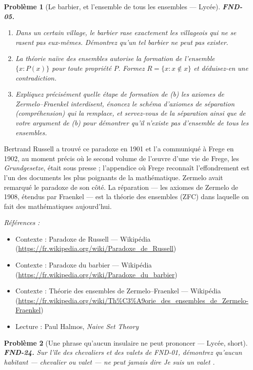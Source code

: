 \documentclass[11pt]{article}
\newtheorem{problem}{Problème}
\newenvironment{refs}{\par\small\noindent\emph{Références :}\begin{itemize}\setlength\itemsep{0pt}}{\end{itemize}\normalsize}
\begin{document}
\begin{problem}[{Le barbier, et l'ensemble de tous les ensembles --- Lycée}]
\textbf{FND-05.} \begin{enumerate}
\item[(a)] Dans un certain village, le barbier rase exactement les
villageois qui ne se rasent pas eux-mêmes. Démontrez qu'un tel barbier ne peut pas exister.
\item[(b)] La théorie naïve des ensembles
autorise la formation de l'ensemble $ \{x : P(x)\} $ pour toute propriété $ P $. Formez
$ R = \{x : x \notin x\} $ et déduisez-en une contradiction.
\item[(c)] Expliquez précisément quelle étape
de formation de (b) les axiomes de Zermelo--Fraenkel interdisent, énoncez le schéma d'axiomes de
séparation (compréhension) qui la remplace, et servez-vous de la séparation ainsi que de votre
argument de (b) pour démontrer qu'il n'existe pas d'ensemble de tous les ensembles.
\end{enumerate}

\end{problem}

\noindent Bertrand Russell a trouvé ce paradoxe en 1901 et l'a communiqué à Frege en
1902, au moment précis où le second volume de l'\oe{}uvre d'une vie de Frege, les
\textit{Grundgesetze}, était sous presse ; l'appendice où Frege reconnaît l'effondrement est l'un
des documents les plus poignants de la mathématique. Zermelo avait remarqué le paradoxe de son
côté. La réparation --- les axiomes de Zermelo de 1908, étendus par Fraenkel --- est la théorie des
ensembles (ZFC) dans laquelle on fait des mathématiques aujourd'hui.

\begin{refs}
\item Contexte : Paradoxe de Russell --- Wikipédia (\url{https://fr.wikipedia.org/wiki/Paradoxe_de_Russell})
\item Contexte : Paradoxe du barbier --- Wikipédia (\url{https://fr.wikipedia.org/wiki/Paradoxe_du_barbier})
\item Contexte : Théorie des ensembles de Zermelo--Fraenkel --- Wikipédia (\url{https://fr.wikipedia.org/wiki/Th%C3%A9orie_des_ensembles_de_Zermelo-Fraenkel})
\item Lecture : Paul Halmos, \textit{Naive Set Theory}
\end{refs}

\bigskip

\begin{problem}[{Une phrase qu'aucun insulaire ne peut prononcer --- Lycée, short}]
\textbf{FND-24.} Sur l'île des chevaliers et des valets de FND-01, démontrez
qu'aucun habitant --- chevalier ou valet --- ne peut jamais dire \og{} Je suis un valet \fg{}.
\end{problem}
\end{document}
